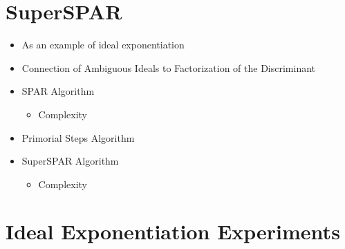 \documentclass[11pt, letterpaper]{article}
\theoremstyle{definition}
\begin{document}
\bigbreak
\section{SuperSPAR}
\begin{itemize}
\item As an example of ideal exponentiation
\item Connection of Ambiguous Ideals to Factorization of the Discriminant
\item SPAR Algorithm
	\begin{itemize}
		\item Complexity
	\end{itemize}
\item Primorial Steps Algorithm
\item SuperSPAR Algorithm
	\begin{itemize}
		\item Complexity
	\end{itemize}
\end{itemize}


\bigbreak
\section{Ideal Exponentiation Experiments}
\end{document}
